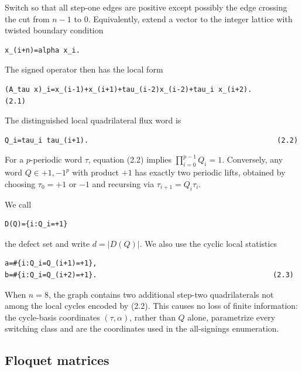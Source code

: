 Switch so that all step-one edges are positive except possibly the edge
crossing the cut from \(n-1\) to \(0\). Equivalently, extend a vector to the
integer lattice with twisted boundary condition

\begin{lstlisting}[language={}]
x_(i+n)=alpha x_i.
\end{lstlisting}

The signed operator then has the local form

\begin{lstlisting}[language={}]
(A_tau x)_i=x_(i-1)+x_(i+1)+tau_(i-2)x_(i-2)+tau_i x_(i+2).       (2.1)
\end{lstlisting}

The distinguished local quadrilateral flux word is

\begin{lstlisting}[language={}]
Q_i=tau_i tau_(i+1).                                             (2.2)
\end{lstlisting}

For a \(p\)-periodic word \(\tau\), equation (2.2) implies
\(\prod_{i=0}^{p-1} Q_i=1\). Conversely, any word
\(Q \in {+1,-1}^p\) with product \(+1\) has exactly two periodic lifts, obtained by
choosing \(\tau_0=+1\) or \(-1\) and recursing via
\(\tau_{i+1}=Q_i \tau_i\).

We call

\begin{lstlisting}[language={}]
D(Q)={i:Q_i=+1}
\end{lstlisting}

the defect set and write \(d=|D(Q)|\). We also use the cyclic local statistics

\begin{lstlisting}[language={}]
a=#{i:Q_i=Q_(i+1)=+1},
b=#{i:Q_i=Q_(i+2)=+1}.                                          (2.3)
\end{lstlisting}

When \(n=8\), the graph contains two additional step-two quadrilaterals not
among the local cycles encoded by (2.2). This causes no loss of finite
information: the cycle-basis coordinates \((\tau,\alpha)\), rather than \(Q\) alone,
parametrize every switching class and are the coordinates used in the
all-signings enumeration.

\subsection{Floquet matrices}

